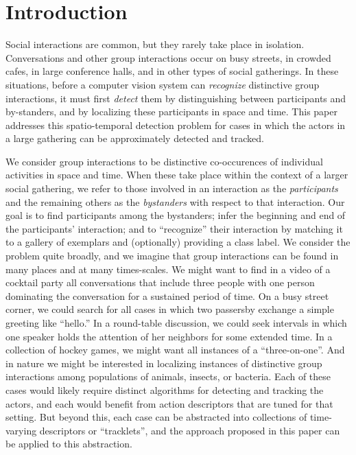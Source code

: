 \section{Introduction}

Social interactions are common, but they rarely take place in isolation. Conversations and other group interactions occur on busy streets, in crowded cafes, in large conference halls, and in other types of social gatherings. In these situations, before a computer vision system can \emph{recognize} distinctive group interactions, it must first \emph{detect} them by distinguishing between participants and by-standers, and by localizing these participants in space and time. This paper addresses this spatio-temporal detection problem for cases in which the actors in a large gathering can be approximately detected and tracked.

We consider group interactions to be distinctive co-occurences of individual activities in space and time. When these take place within the context of a larger social gathering, we refer to those involved in an interaction as the \emph{participants} and the remaining others as the \emph{bystanders} with respect to that interaction. Our goal is to find participants among the bystanders; infer the beginning and end of the participants' interaction; and to ``recognize'' their interaction by matching it to a gallery of exemplars and (optionally) providing a class label. We consider the problem quite broadly, and we imagine that group interactions can be found in many places and at many times-scales. We might want to find in a video of a cocktail party all conversations that include three people with one person dominating the conversation for a sustained period of time. On a busy street corner, we could search for all cases in which two passersby exchange a simple greeting like ``hello.'' In a round-table discussion, we could seek intervals in which one speaker holds the attention of her neighbors for some extended time. In a collection of hockey games, we might want all instances of a ``three-on-one''. And in nature we might be interested in localizing instances of distinctive group interactions among populations of animals, insects, or bacteria. Each of these cases would likely require distinct algorithms for detecting and tracking the actors, and each would benefit from action descriptors that are tuned for that setting. But beyond this, each case can be abstracted into collections of time-varying descriptors or ``tracklets'', and the approach proposed in this paper can be applied to this abstraction.
 
